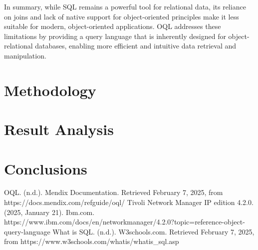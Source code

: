 \documentclass{article}
\begin{document}
In summary, while SQL remains a powerful tool for relational data, its reliance on joins and lack of native support for object-oriented principles make it less suitable for modern, object-oriented applications. OQL addresses these limitations by providing a query language that is inherently designed for object-relational databases, enabling more efficient and intuitive data retrieval and manipulation.

\section{Methodology}
\section{Result Analysis}
\section{Conclusions}

\begin{thebibliography}{9}
	OQL. (n.d.). Mendix Documentation. Retrieved February 7, 2025, from https://docs.mendix.com/refguide/oql/
	Tivoli Network Manager IP edition 4.2.0. (2025, January 21). Ibm.com. https://www.ibm.com/docs/en/networkmanager/4.2.0?topic=reference-object-query-language
	What is SQL. (n.d.). W3schools.com. Retrieved February 7, 2025, from https://www.w3schools.com/whatis/whatis\_sql.asp
\end{thebibliography}
\end{document}

